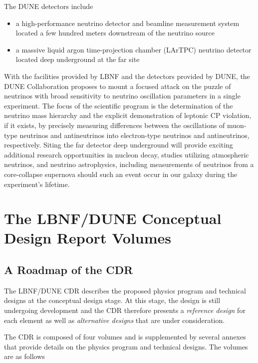 The DUNE detectors include
\begin{itemize}
\item a high-performance neutrino detector and beamline 
measurement system
located a few hundred meters downstream of the neutrino source
\item a massive liquid argon time-projection chamber (LArTPC) neutrino detector located deep underground at the far site
\end{itemize}

With the facilities provided by LBNF and the detectors provided by
DUNE, the DUNE Collaboration proposes to mount a focused attack on the
puzzle of neutrinos with broad sensitivity to neutrino oscillation
parameters in a single experiment.  The focus of the scientific
program is the determination of the neutrino mass hierarchy and the
explicit demonstration of leptonic CP violation, if it exists, by
precisely measuring differences between the oscillations of muon-type
neutrinos and antineutrinos into electron-type neutrinos and
antineutrinos, respectively. Siting the far detector deep underground
will provide exciting additional research opportunities in nucleon
decay, studies utilizing atmospheric neutrinos, and neutrino
astrophysics, including measurements of neutrinos from a core-collapse
supernova should such an event occur in our galaxy during the
experiment's lifetime.

\section{The LBNF/DUNE Conceptual Design Report Volumes}

\subsection{A Roadmap of the CDR}

The LBNF/DUNE CDR describes the proposed physics program and 
technical designs at the conceptual design stage.  At this stage, the design is
still undergoing development and the CDR therefore presents a \textit{reference design} 
for each element as well as \textit{alternative designs} that are under consideration.

The CDR is composed of four volumes and is supplemented by several annexes that 
provide details on the physics program and technical designs. The volumes are as follows

